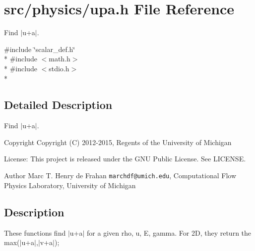 \section{src/physics/upa.h File Reference}
\label{upa_8h}


Find $\vert$u+a$\vert$.  


{\ttfamily \#include \char`\"{}scalar\-\_\-def.\-h\char`\"{}}\\*
{\ttfamily \#include $<$math.\-h$>$}\\*
{\ttfamily \#include $<$stdio.\-h$>$}\\*


\subsection{Detailed Description}
Find $\vert$u+a$\vert$. \begin{DoxyCopyright}{Copyright}
Copyright (C) 2012-\/2015, Regents of the University of Michigan 
\end{DoxyCopyright}
\begin{DoxyParagraph}{License\-:}
This project is released under the G\-N\-U Public License. See L\-I\-C\-E\-N\-S\-E. 
\end{DoxyParagraph}
\begin{DoxyAuthor}{Author}
Marc T. Henry de Frahan {\tt marchdf@umich.\-edu}, Computational Flow Physics Laboratory, University of Michigan 
\end{DoxyAuthor}
\subsection{Description}\label{scalar__def_8h_Description}
These functions find $\vert$u+a$\vert$ for a given rho, u, E, gamma. For 2\-D, they return the max($\vert$u+a$\vert$,$\vert$v+a$\vert$); 